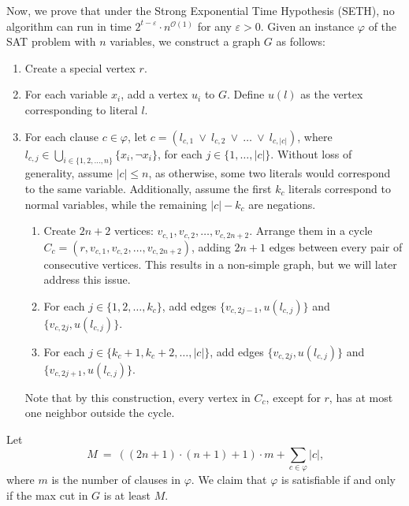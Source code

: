 \documentclass[12pt]{article}
\begin{document}
	Now, we prove that under the Strong Exponential Time Hypothesis (SETH), no
	algorithm can run in time \(2^{t - \varepsilon} \cdot n^{\mathcal{O}(1)}\)
	for any \(\varepsilon > 0\). Given an instance \(\varphi\) of the SAT
	problem with \(n\) variables, we construct a graph \(G\) as follows:
	\begin{enumerate}
		\item Create a special vertex \(r\).
		\item For each variable \(x_{i}\), add a vertex \(u_{i}\) to \(G\).
		      Define \(u(l)\) as the vertex corresponding to literal \(l\).
		\item For each clause \(c \in \varphi\), let \(c = (l_{c, 1} \ \vee \
		      l_{c, 2} \ \vee \ \ldots \ \vee \ l_{c, |c|})\), where \(l_{c, j}
		      \in \bigcup\limits_{i \in \{1, 2, \ldots, n\}} \{x_{i}, \neg
		      x_{i}\}\), for each \(j \in \{1, \ldots, |c|\}\). Without loss of
		      generality, assume \(|c| \leqslant n\), as otherwise, some two
		      literals would correspond to the same variable. Additionally,
		      assume the first \(k_{c}\) literals correspond to normal
		      variables, while the remaining \(|c| - k_{c}\) are negations.
		      \begin{enumerate}[label=\theenumi.\arabic*]
		          \item Create \(2n + 2\) vertices: \(v_{c, 1}, v_{c, 2},
		                \ldots, v_{c, 2n + 2}\). Arrange them in a cycle
		                \(C_{c} = (r, v_{c, 1}, v_{c, 2}, \allowbreak \ldots,
		                v_{c, 2n + 2})\), adding \(2n + 1\) edges between every
		                pair of consecutive vertices. This results in a
		                non-simple graph, but we will later address this issue.
		          \item For each \(j \in \{1, 2, \ldots, k_{c}\}\), add edges
		                \(\{v_{c, 2j - 1}, u(l_{c, j})\}\) and
		                \(\{v_{c, 2j}, u(l_{c, j})\}\).
		          \item For each \(j \in \{k_{c} + 1, k_{c} + 2, \ldots,
		                |c|\}\), add edges \(\{v_{c, 2j}, u(l_{c, j})\}\) and
		                \(\{v_{c, 2j + 1}, u(l_{c, j})\}\).
		      \end{enumerate}
		      Note that by this construction, every vertex in \(C_{c}\), except
		      for \(r\), has at most one neighbor outside the cycle.
	\end{enumerate}
	Let
	\[ M \ = \ ((2n + 1) \cdot (n + 1) + 1) \cdot m +
	\sum\limits_{c \in \varphi} |c| \text{,} \]
	where \(m\) is the number of clauses in \(\varphi\). We claim that
	\(\varphi\) is satisfiable if and only if the max cut in \(G\) is at least
	\(M\).
	
\end{document}
